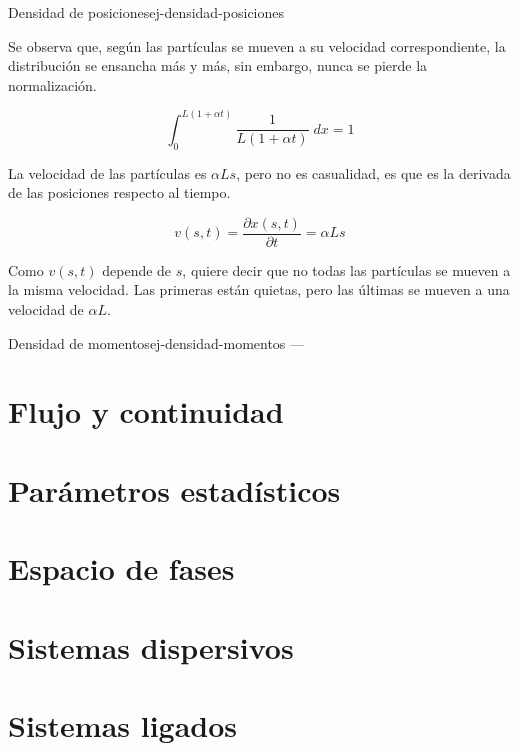 \begin{ejemplo}{Densidad de posiciones}{ej-densidad-posiciones}
\begin{center}
\end{center}

Se observa que, según las partículas se mueven a su velocidad correspondiente, la distribución se ensancha más y más, sin embargo, nunca se pierde la normalización.

\[\int_0^{L(1+\alpha t)}\frac{1}{L(1+\alpha t)}\;dx=1\]

La velocidad de las partículas es $\alpha Ls$, pero no es casualidad, es que es la derivada de las posiciones respecto al tiempo.

\[v(s,t)=\frac{\partial x(s,t)}{\partial t}=\alpha Ls \]

Como $v(s,t)$ depende de $s$, quiere decir que no todas las partículas se mueven a la misma velocidad. Las primeras están quietas, pero las últimas se mueven a una velocidad de $\alpha L$.

\end{ejemplo}


\begin{ejemplo}{Densidad de momentos}{ej-densidad-momentos}
---
\end{ejemplo}


\newpage\section{Flujo y continuidad}
\newpage\section{Parámetros estadísticos}
\newpage\section{Espacio de fases}
\newpage\section{Sistemas dispersivos}
\newpage\section{Sistemas ligados}





